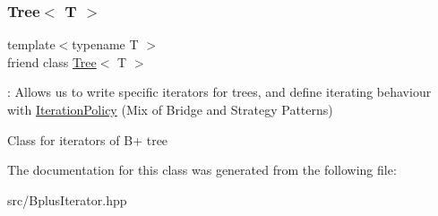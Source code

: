 \subsubsection{\texorpdfstring{Tree$<$ T $>$}{Tree< T >}}
{\footnotesize\ttfamily template$<$typename T $>$ \\
friend class \hyperlink{classTree}{Tree}$<$ T $>$\hspace{0.3cm}{\ttfamily [friend]}}



\+: Allows us to write specific iterators for trees, and define iterating behaviour with \hyperlink{classIterationPolicy}{Iteration\+Policy} (Mix of Bridge and Strategy Patterns) 

Class for iterators of B+ tree 

The documentation for this class was generated from the following file\+:\begin{DoxyCompactItemize}
\item 
src/Bplus\+Iterator.\+hpp\end{DoxyCompactItemize}
